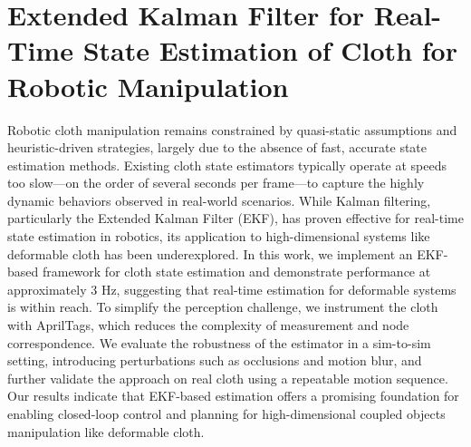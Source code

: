 \graphicspath{{sections/06_Cloth_Estimation/}}

\chapter{Extended Kalman Filter for Real-Time State Estimation of Cloth for Robotic Manipulation}\label{sec:cloth}



   
Robotic cloth manipulation remains constrained by quasi-static assumptions and heuristic-driven strategies, largely due to the absence of fast, accurate state estimation methods. Existing cloth state estimators typically operate at speeds too slow—on the order of several seconds per frame—to capture the highly dynamic behaviors observed in real-world scenarios. While Kalman filtering, particularly the Extended Kalman Filter (EKF), has proven effective for real-time state estimation in robotics, its application to high-dimensional systems like deformable cloth has been underexplored. In this work, we implement an EKF-based framework for cloth state estimation and demonstrate performance at approximately 3 Hz, suggesting that real-time estimation for deformable systems is within reach. To simplify the perception challenge, we instrument the cloth with AprilTags, which reduces the complexity of measurement and node correspondence. We evaluate the robustness of the estimator in a sim-to-sim setting, introducing perturbations such as occlusions and motion blur, and further validate the approach on real cloth using a repeatable motion sequence. Our results indicate that EKF-based estimation offers a promising foundation for enabling closed-loop control and planning for high-dimensional coupled objects manipulation like deformable cloth.



